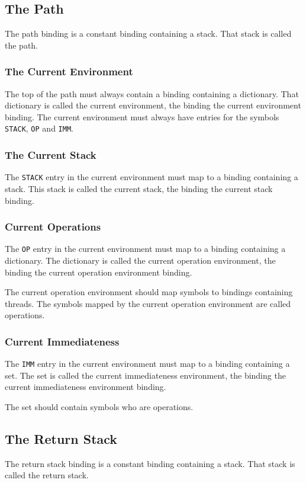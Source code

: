 \documentclass[a4paper]{article}
\begin{document}
\subsection{The Path}
The path binding is a constant binding containing a stack. That stack is called
the path.
\subsubsection{The Current Environment}
The top of the path must always contain a binding containing a dictionary. That
dictionary is called the current environment, the binding the current
environment binding. The current environment must always have entries for the
symbols \texttt{STACK}, \texttt{OP} and \texttt{IMM}.
\subsubsection{The Current Stack}
The \texttt{STACK} entry in the current environment must map to a binding
containing a stack. This stack is called the current stack, the binding the
current stack binding.
\subsubsection{Current Operations}
The \texttt{OP} entry in the current environment must map to a binding
containing a dictionary. The dictionary is called the current operation
environment, the binding the current operation environment binding.

The current operation environment should map symbols to bindings containing
threads. The symbols mapped by the current operation environment are called
operations.
\subsubsection{Current Immediateness}
The \texttt{IMM} entry in the current environment must map to a binding
containing a set. The set is called the current immediateness environment, the
binding the current immediateness environment binding.

The set should contain symbols who are operations.

\subsection{The Return Stack}
The return stack binding is a constant binding containing a stack. That stack is
called the return stack.
\end{document}
